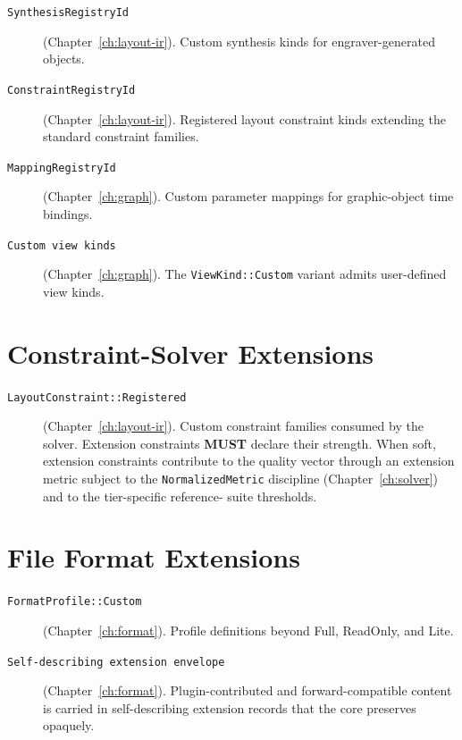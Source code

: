 \documentclass[11pt,letterpaper]{report}
\newcommand{\MUST}{\textbf{MUST}}
\begin{document}
\begin{description}
  \item[\texttt{SynthesisRegistryId}] (Chapter~\ref{ch:layout-ir}).
    Custom synthesis kinds for engraver-generated objects.
  \item[\texttt{ConstraintRegistryId}] (Chapter~\ref{ch:layout-ir}).
    Registered layout constraint kinds extending the standard
    constraint families.
  \item[\texttt{MappingRegistryId}] (Chapter~\ref{ch:graph}).
    Custom parameter mappings for graphic-object time bindings.
  \item[\texttt{Custom view kinds}] (Chapter~\ref{ch:graph}).
    The \texttt{ViewKind::Custom} variant admits user-defined
    view kinds.
\end{description}

\section{Constraint-Solver Extensions}
\label{sec:ext:solver}

\begin{description}
  \item[\texttt{LayoutConstraint::Registered}]
    (Chapter~\ref{ch:layout-ir}). Custom constraint families
    consumed by the solver. Extension constraints \MUST{} declare
    their strength. When soft, extension constraints contribute
    to the quality vector through an extension metric subject to
    the \texttt{NormalizedMetric} discipline
    (Chapter~\ref{ch:solver}) and to the tier-specific reference-
    suite thresholds.
\end{description}

\section{File Format Extensions}
\label{sec:ext:format}

\begin{description}
  \item[\texttt{FormatProfile::Custom}] (Chapter~\ref{ch:format}).
    Profile definitions beyond Full, ReadOnly, and Lite.
  \item[\texttt{Self-describing extension envelope}]
    (Chapter~\ref{ch:format}). Plugin-contributed and
    forward-compatible content is carried in self-describing
    extension records that the core preserves opaquely.
\end{description}
\end{document}
